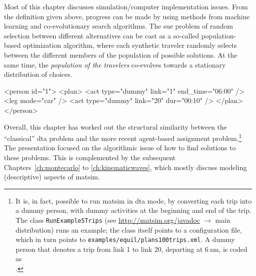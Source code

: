 Most of this chapter discusses simulation/computer implementation issues.
From the definition given above, progress can be made by using methods
from machine learning and co-evolutionary search algorithms.  
%
The \gls{sue} problem of random selection between different alternatives can
be cast as a so-called population-based optimization algorithm, where
each synthetic traveler randomly selects between the different
members of the population of possible solutions.
%
At the same time, the \emph{population of the travelers} co-evolves
towards a stationary distribution of choices.

\newsavebox{\tripAsPlan}
\begin{lrbox}{\tripAsPlan}
\begin{xml}
<person id="1">
   <plan>
      <act type="dummy" link="1" end_time="06:00" />
      <leg mode="car" />
      <act type="dummy" link="20" dur="00:10" />
   </plan>
</person>
\end{xml}
\end{lrbox}

Overall, this chapter has worked out the structural similarity between the
``classical'' \gls{dta} problem and the more recent agent-based assignment
problem.\footnote{%
It is, in fact, possible to run \gls{matsim} in \gls{dta} mode, by converting
each trip into a dummy person, with dummy activities at the beginning and end of
the trip.  The class \lstinline{RunExample5Trips} (see
\url{http://matsim.org/javadoc} $\to$ main distribution) runs an example; the
class itself points to a configuration file, which in turn points to
\lstinline{examples/equil/plans100trips.xml}.  A dummy person that denotes a
trip from link 1 to link 20, departing at 6\,am, is coded as\\
\usebox{\tripAsPlan}.
} The presentation  focused on the algorithmic issue of how to find
solutions to these problems. This is complemented by the subsequent
Chapters~\ref{ch:montecarlo} to \ref{ch:kinematicwaves}, which mostly discuss
modeling (descriptive) aspects of \gls{matsim}.

